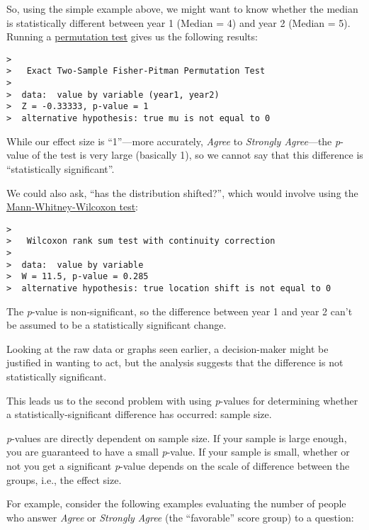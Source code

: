 \documentclass[]{book}
\begin{document}
So, using the simple example above, we might want to know whether the
median is statistically different between year 1 (Median = 4) and year 2
(Median = 5). Running a
\href{https://en.wikipedia.org/wiki/Resampling_(statistics)\#Permutation_tests}{permutation
test} gives us the following results:

\begin{verbatim}
>  
>   Exact Two-Sample Fisher-Pitman Permutation Test
>  
>  data:  value by variable (year1, year2)
>  Z = -0.33333, p-value = 1
>  alternative hypothesis: true mu is not equal to 0
\end{verbatim}

While our effect size is ``1''---more accurately, \emph{Agree} to
\emph{Strongly Agree}---the \emph{p}-value of the test is very large
(basically 1), so we cannot say that this difference is ``statistically
significant''.

We could also ask, ``has the distribution shifted?'', which would
involve using the
\href{https://en.wikipedia.org/wiki/Mann\%E2\%80\%93Whitney_U_test}{Mann-Whitney-Wilcoxon
test}:

\begin{verbatim}
>  
>   Wilcoxon rank sum test with continuity correction
>  
>  data:  value by variable
>  W = 11.5, p-value = 0.285
>  alternative hypothesis: true location shift is not equal to 0
\end{verbatim}

The \emph{p}-value is non-significant, so the difference between year 1
and year 2 can't be assumed to be a statistically significant change.

Looking at the raw data or graphs seen earlier, a decision-maker might
be justified in wanting to act, but the analysis suggests that the
difference is not statistically significant.

This leads us to the second problem with using \emph{p}-values for
determining whether a statistically-significant difference has occurred:
sample size.

\emph{p}-values are directly dependent on sample size. If your sample is
large enough, you are guaranteed to have a small \emph{p}-value. If your
sample is small, whether or not you get a significant \emph{p}-value
depends on the scale of difference between the groups, i.e., the effect
size.

For example, consider the following examples evaluating the number of
people who answer \emph{Agree} or \emph{Strongly Agree} (the
``favorable'' score group) to a question:
\end{document}
